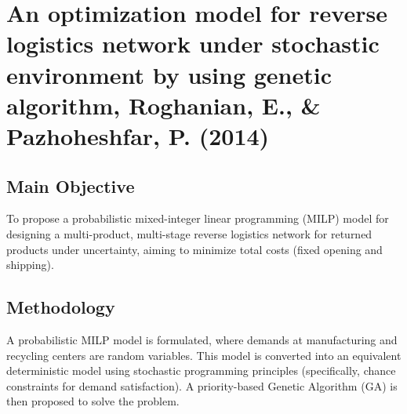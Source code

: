 \section{{An optimization model for reverse logistics network under stochastic environment by using genetic algorithm, Roghanian, E., \& Pazhoheshfar, P. (2014)}}

\subsection*{Main Objective}
To propose a probabilistic mixed-integer linear programming (MILP) model for designing a multi-product, multi-stage reverse logistics network for returned products under uncertainty, aiming to minimize total costs (fixed opening and shipping).

\subsection*{Methodology}
A probabilistic MILP model is formulated, where demands at manufacturing and recycling centers are random variables. This model is converted into an equivalent deterministic model using stochastic programming principles (specifically, chance constraints for demand satisfaction). A priority-based Genetic Algorithm (GA) is then proposed to solve the problem.

